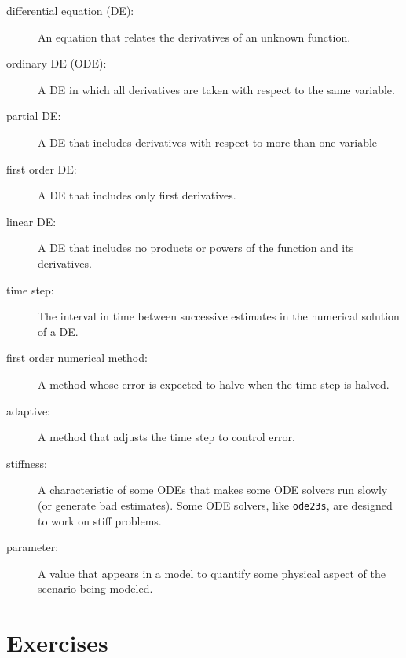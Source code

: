 \documentclass{book}
\begin{document}
\begin{description}

\item[differential equation (DE):] An equation that relates the
derivatives of an unknown function.

\item[ordinary DE (ODE):] A DE in which all derivatives are taken with
respect to the same variable.

\item[partial DE:] A DE that includes derivatives with respect to
more than one variable

\item[first order DE:] A DE that includes only first derivatives.

\item[linear DE:] A DE that includes no products or powers of the
function and its derivatives.

\item[time step:] The interval in time between successive estimates
in the numerical solution of a DE.

\item[first order numerical method:] A method whose error is expected
to halve when the time step is halved.

\item[adaptive:] A method that adjusts the time step to control error.

\item[stiffness:] A characteristic of some ODEs that makes some ODE
solvers run slowly (or generate bad estimates).  Some ODE solvers,
like {\tt ode23s}, are designed to work on stiff problems.

\item[parameter:] A value that appears in a model to quantify some
physical aspect of the scenario being modeled.

\end{description}

\section{Exercises}

\newcommand{\degree}{\ensuremath{^\circ}}
\end{document}
